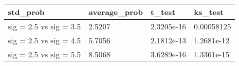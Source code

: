 \begin{tabular}{llll}
std_prob & average_prob & t_test & ks_test \\ 
\hline 
sig = 2.5 vs sig = 3.5 & 2.5207 & 2.3205e-16 & 0.00058125 \\ 
sig = 2.5 vs sig = 4.5 & 5.7056 & 2.1812e-13 & 1.2681e-12 \\ 
sig = 2.5 vs sig = 5.5 & 8.5068 & 3.6289e-16 & 1.3361e-15 \\ 
\hline 
\end{tabular}